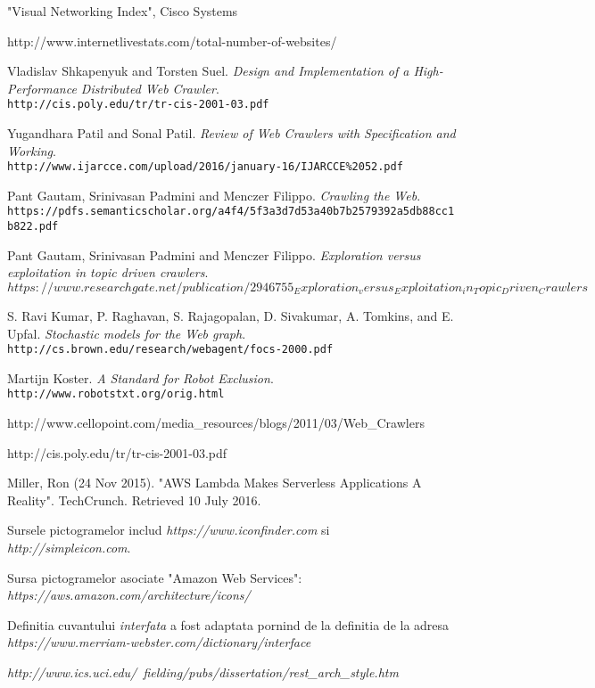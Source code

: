 \begin{thebibliography}{99}

"Visual Networking Index", Cisco Systems
  
http://www.internetlivestats.com/total-number-of-websites/

Vladislav Shkapenyuk and Torsten Suel.
\textit{Design and Implementation of a High-Performance Distributed Web Crawler}.\\
\texttt{http://cis.poly.edu/tr/tr-cis-2001-03.pdf}

Yugandhara Patil and Sonal Patil.
\textit{Review of Web Crawlers with Specification and Working}.\\
\texttt{http://www.ijarcce.com/upload/2016/january-16/IJARCCE\%2052.pdf}

Pant Gautam, Srinivasan Padmini and Menczer Filippo.
\textit{Crawling the Web}.\\
\texttt{https://pdfs.semanticscholar.org/a4f4/5f3a3d7d53a40b7b2579392a5db88cc1b822.pdf}

Pant Gautam, Srinivasan Padmini and Menczer Filippo.
\textit{Exploration versus exploitation in topic driven crawlers}.\\
\texttt{$https://www.researchgate.net/publication/2946755_Exploration_versus_Exploitation_in_Topic_Driven_Crawlers$}

S. Ravi Kumar, P. Raghavan, S. Rajagopalan, D. Sivakumar, A. Tomkins, and E. Upfal.
\textit{Stochastic models for the Web graph}.\\
\texttt{http://cs.brown.edu/research/webagent/focs-2000.pdf}

Martijn Koster.
\textit{A Standard for Robot Exclusion}.\\
\texttt{http://www.robotstxt.org/orig.html}
  
http://www.cellopoint.com/media\_resources/blogs/2011/03/Web\_Crawlers

http://cis.poly.edu/tr/tr-cis-2001-03.pdf

Miller, Ron (24 Nov 2015). "AWS Lambda Makes Serverless Applications A Reality". TechCrunch. Retrieved 10 July 2016.

Sursele pictogramelor includ \emph{https://www.iconfinder.com} si \emph{http://simpleicon.com}.

Sursa pictogramelor asociate "Amazon Web Services": \emph{https://aws.amazon.com/architecture/icons/}

Definitia cuvantului \textit{interfata} a fost adaptata pornind de la definitia de la adresa \emph{https://www.merriam-webster.com/dictionary/interface}

\emph{http://www.ics.uci.edu/~fielding/pubs/dissertation/rest\_arch\_style.htm}

\end{thebibliography}
